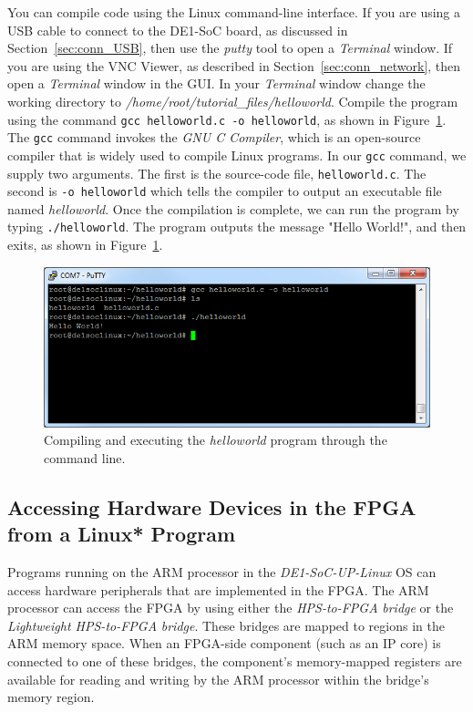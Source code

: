 \documentclass[11pt, twoside, pdftex]{article}
\begin{document}
You can compile code using the Linux command-line interface. If you are using a USB cable
to connect to the DE1-SoC board, as discussed in Section~\ref{sec:conn_USB}, then use the
{\it putty} tool to open a {\it Terminal} window. If you are using the VNC Viewer, as 
described in Section~\ref{sec:conn_network}, then open a {\it Terminal} window in the GUI. 
In your {\it Terminal} window change the working directory to 
\textit{/home/root/tutorial\_files/helloworld}. 
Compile the program using the command \texttt{gcc helloworld.c -o helloworld}, as 
shown in Figure~\ref{fig:helloworld_native}. The \texttt{gcc} command invokes 
the \textit{GNU C Compiler}, which is an open-source compiler that is widely used to compile 
Linux programs. In our \texttt{gcc} command, we supply two arguments. The first is the source-code 
file, \texttt{helloworld.c}. The second is \texttt{-o helloworld} which 
tells the compiler to output an executable file named \textit{helloworld}. Once the compilation 
is complete, we can run the program by typing \texttt{./helloworld}. The program outputs the 
message "Hello World!", and then exits, as shown in Figure~\ref{fig:helloworld_native}.
~\\
\begin{figure}[H]
   \begin{center}
       \includegraphics[scale=0.7]{figures/compilation_1}
   \end{center}
   \caption{Compiling and executing the \textit{helloworld} program through the command line.}
	\label{fig:helloworld_native}
\end{figure}

\subsection{Accessing Hardware Devices in the FPGA from a Linux* Program}

Programs running on the ARM processor in the {\it DE1-SoC-UP-Linux} OS can access hardware 
peripherals that are implemented in the FPGA. The ARM processor can access the FPGA
by using either the {\it HPS-to-FPGA} {\it bridge} or 
the {\it Lightweight HPS-to-FPGA} {\it bridge}. These bridges are mapped to regions 
in the ARM memory space. When an FPGA-side component (such as an IP core) is connected to one 
of these bridges, the component's memory-mapped registers are available for reading and writing 
by the ARM processor within the bridge's memory region. 
\end{document}
